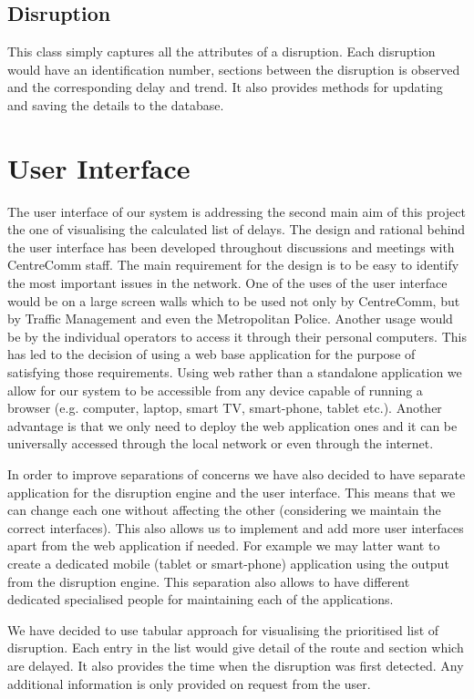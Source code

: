 \subsection{Disruption}
This class simply captures all the attributes of a disruption. Each disruption would have an identification number, sections between the disruption is observed and the corresponding delay and trend. It also provides methods for updating and saving the details to the database.

\section{User Interface}
The user interface of our system is addressing the second main aim of this project the one of visualising the calculated list of delays. The design and rational behind the user interface has been developed throughout discussions and meetings with CentreComm staff. The main requirement for the design is to be easy to identify the most important issues in the network. One of the uses of the user interface would be on a large screen walls which to be used not only by CentreComm, but by Traffic Management and even the Metropolitan Police. Another usage would be by the individual operators to access it through their personal computers. This has led to the decision of using a web base application for the purpose of satisfying those requirements. Using web rather than a standalone application we allow for our system to be accessible from any device capable of running a browser (e.g. computer, laptop, smart TV, smart-phone, tablet etc.). Another advantage is that we only need to deploy the web application ones and it can be universally accessed through the local network or even through the internet.

In order to improve separations of concerns we have also decided to have separate application for the disruption engine and the user interface. This means that we can change each one without affecting the other (considering we maintain the correct interfaces). This also allows us to implement and add more user interfaces apart from the web application if needed. For example we may latter want to create a dedicated mobile (tablet or smart-phone) application using the output from the disruption engine. This separation also allows to have different dedicated specialised people for maintaining each of the applications.

We have decided to use tabular approach for visualising the prioritised list of disruption. Each entry in the list would give detail of the route and section which are delayed. It also provides the time when the disruption was first detected. Any additional information is only provided on request from the user.

